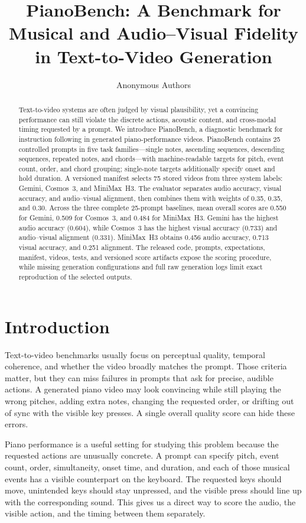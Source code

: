 \documentclass{article}
\title{PianoBench: A Benchmark for Musical and Audio--Visual Fidelity in Text-to-Video Generation}
\author{Anonymous Authors}
\begin{document}
\maketitle

\begin{abstract}
Text-to-video systems are often judged by visual plausibility, yet a convincing performance can still violate the discrete actions, acoustic content, and cross-modal timing requested by a prompt. We introduce PianoBench, a diagnostic benchmark for instruction following in generated piano-performance videos. PianoBench contains 25 controlled prompts in five task families---single notes, ascending sequences, descending sequences, repeated notes, and chords---with machine-readable targets for pitch, event count, order, and chord grouping; single-note targets additionally specify onset and hold duration. A versioned manifest selects 75 stored videos from three system labels: Gemini, Cosmos~3, and MiniMax~H3. The evaluator separates audio accuracy, visual accuracy, and audio--visual alignment, then combines them with weights of 0.35, 0.35, and 0.30. Across the three complete 25-prompt baselines, mean overall scores are 0.550 for Gemini, 0.509 for Cosmos~3, and 0.484 for MiniMax~H3. Gemini has the highest audio accuracy (0.604), while Cosmos~3 has the highest visual accuracy (0.733) and audio--visual alignment (0.331). MiniMax~H3 obtains 0.456 audio accuracy, 0.713 visual accuracy, and 0.251 alignment. The released code, prompts, expectations, manifest, videos, tests, and versioned score artifacts expose the scoring procedure, while missing generation configurations and full raw generation logs limit exact reproduction of the selected outputs.
\end{abstract}

\section{Introduction}
\label{sec:introduction}

Text-to-video benchmarks usually focus on perceptual quality, temporal coherence, and whether the video broadly matches the prompt. Those criteria matter, but they can miss failures in prompts that ask for precise, audible actions. A generated piano video may look convincing while still playing the wrong pitches, adding extra notes, changing the requested order, or drifting out of sync with the visible key presses. A single overall quality score can hide these errors.

Piano performance is a useful setting for studying this problem because the requested actions are unusually concrete. A prompt can specify pitch, event count, order, simultaneity, onset time, and duration, and each of those musical events has a visible counterpart on the keyboard. The requested keys should move, unintended keys should stay unpressed, and the visible press should line up with the corresponding sound. This gives us a direct way to score the audio, the visible action, and the timing between them separately.
\end{document}
